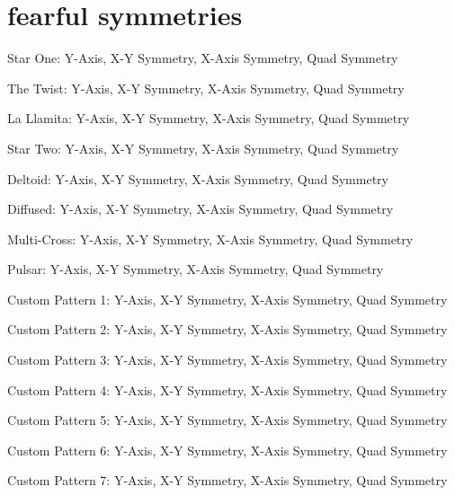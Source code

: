 \chapter{fearful symmetries} 
\label{sec:symmetries}
\rhead[]{\leftmark}
\lstset{style=6502Style}
\lstset{ 
   aboveskip=5pt,
   belowskip=0pt,
}

\newcommand\addItem[2]%
{
  \expandafter\def\csname row:#1\endcsname{#2}%
}

\newcommand\showItem[1]%
{\expandafter\csname row:#1\endcsname}


\newcommand\getItem[1]%
{\noindent
  \text{\showItem{#1}}
  \par
}
\addItem{0}{Star One: Y-Axis, X-Y Symmetry, X-Axis Symmetry, Quad Symmetry}
\addItem{1}{The Twist: Y-Axis, X-Y Symmetry, X-Axis Symmetry, Quad Symmetry}
\addItem{2}{La Llamita: Y-Axis, X-Y Symmetry, X-Axis Symmetry, Quad Symmetry}
\addItem{3}{Star Two: Y-Axis, X-Y Symmetry, X-Axis Symmetry, Quad Symmetry}
\addItem{4}{Deltoid: Y-Axis, X-Y Symmetry, X-Axis Symmetry, Quad Symmetry}
\addItem{5}{Diffused: Y-Axis, X-Y Symmetry, X-Axis Symmetry, Quad Symmetry}
\addItem{6}{Multi-Cross: Y-Axis, X-Y Symmetry, X-Axis Symmetry, Quad Symmetry}
\addItem{7}{Pulsar: Y-Axis, X-Y Symmetry, X-Axis Symmetry, Quad Symmetry}
\addItem{8}{Custom Pattern 1: Y-Axis, X-Y Symmetry, X-Axis Symmetry, Quad Symmetry}
\addItem{9}{Custom Pattern 2: Y-Axis, X-Y Symmetry, X-Axis Symmetry, Quad Symmetry}
\addItem{10}{Custom Pattern 3: Y-Axis, X-Y Symmetry, X-Axis Symmetry, Quad Symmetry}
\addItem{11}{Custom Pattern 4: Y-Axis, X-Y Symmetry, X-Axis Symmetry, Quad Symmetry}
\addItem{12}{Custom Pattern 5: Y-Axis, X-Y Symmetry, X-Axis Symmetry, Quad Symmetry}
\addItem{13}{Custom Pattern 6: Y-Axis, X-Y Symmetry, X-Axis Symmetry, Quad Symmetry}
\addItem{14}{Custom Pattern 7: Y-Axis, X-Y Symmetry, X-Axis Symmetry, Quad Symmetry}

